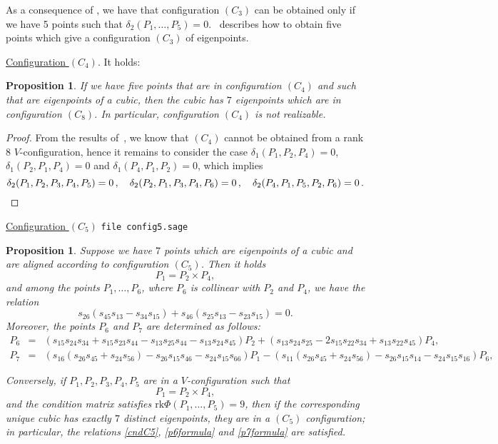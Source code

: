 \documentclass{amsart}
\theoremstyle{plain}
\newtheorem{prop}[lemma]{Proposition}
\theoremstyle{definition}
\newcommand{\rk}{\ensuremath{\mathrm{rk}}}
\begin{document}
As a consequence of , we have that configuration $(C_3)$ can
be obtained only if we have 5 points such that
$\delta_2(P_1, \dotsc, P_5) = 0$.~ describes how to
obtain five points which give a configuration $(C_3)$ of eigenpoints.

\underline{Configuration $(C_4)$}. It holds:
\begin{prop}
\label{conf4no} If we have five points that are in
configuration $(C_4)$ and such that are eigenpoints of a cubic, then the
cubic has $7$ eigenpoints which are in configuration $(C_8)$. In particular,
configuration $(C_4)$ is not realizable.
\end{prop}
\begin{proof}
From the results of~, we know that $(C_4)$
cannot be obtained from a rank 8 $V$-configuration,
hence it remains to consider the case $\delta_1(P_1, P_2, P_4) = 0$,
$\delta_1(P_2, P_1, P_4) = 0$ and $\delta_1(P_4, P_1, P_2) = 0$,
which implies
%
\[
  \delta_2(P_1, P_2, P_3, P_4, P_5)=0 \,, \quad
  \delta_2(P_2, P_1, P_3, P_4, P_6)=0 \,, \quad
  \delta_2(P_4, P_1, P_5, P_2, P_6)=0 \,. \qedhere
\]
%
\end{proof}


\underline{Configuration $(C_5)$}
\verb+file config5.sage+
\begin{prop}
Suppose we have $7$ points which are eigenpoints of a cubic and are
aligned according to configuration $(C_5)$. Then 
it holds
\[
P_1 = P_2 \times P_4,
\]
and among the points $P_1, \dots, P_6$, where $P_6$ is collinear with $P_2$ and $P_4$, we have the relation
\begin{equation}
s_{26}(s_{45}s_{13}-s_{34}s_{15})+s_{46}(s_{25}s_{13}-s_{23}s_{15}) = 0.
\label{cndC5}
\end{equation}
Moreover, the points $P_6$ and $P_7$ are determined as follows:
 \begin{eqnarray}
    P_6 & = & (s_{15}s_{24}s_{34}+s_{15}s_{23}s_{44} -s_{13}s_{25}s_{44} -s_{13}s_{24}s_{45})P_2 + (s_{13}s_{24}s_{25}-2s_{15}s_{22}s_{34}+s_{13}s_{22}s_{45})P_4 ,\label{p6formula}\\
P_7 & = & (s_{16}(s_{26}s_{45}+s_{24}s_{56})-s_{26}s_{15}s_{46}-s_{24}s_{15}s_{66})P_1-
(s_{11}(s_{26}s_{45}+s_{24}s_{56})-s_{26}s_{15}s_{14}-s_{24}s_{15}s_{16})P_6 ,
\label{p7formula}
\end{eqnarray}



Conversely, if $P_1, P_2, P_3, P_4, P_5$ are in a $V$-configuration such that 
\[
P_1=P_2 \times P_4,
\]
and the condition matrix satisfies
$\rk \Phi (P_1, \dots, P_5) =9$, then if the corresponding unique cubic has exactly $7$ distinct eigenpoints, they are in a $(C_5)$ configuration; in particular, the relations \eqref{cndC5}, \eqref{p6formula} and \eqref{p7formula} are satisfied.

\end{prop}
\end{document}
